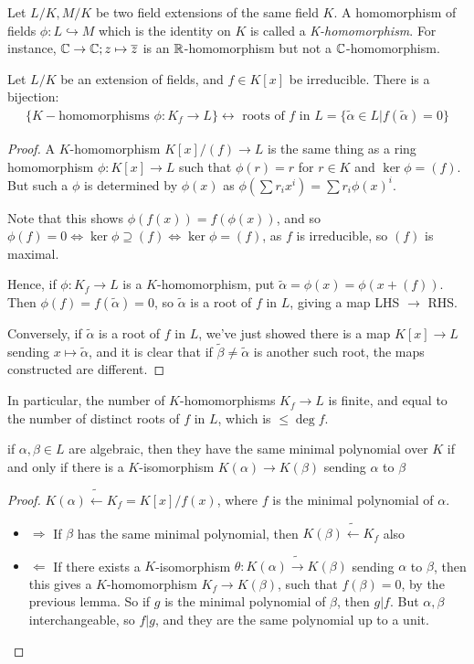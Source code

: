 \documentclass[10pt,a4paper]{article}
\begin{document}
Let $L/K, M/K$ be two field extensions of the same field $K$. A homomorphism of fields $\phi:L\hookrightarrow M$ which is the identity on $K$ is called a \emph{K-homomorphism}. For instance, $\mathbb{C}\rightarrow \mathbb{C}; z\mapsto \overline{z}$ is an $\mathbb{R}$-homomorphism but not a $\mathbb{C}$-homomorphism.
\begin{lemma}
Let $L/K$ be an extension of fields, and $f\in K[x]$ be irreducible. There is a bijection:
\begin{align*}
\{K-\text{homomorphisms } \phi:K_f \rightarrow L\} \longleftrightarrow\text{ roots of $f$ in }L = \{\tilde{\alpha}\in L|f(\tilde{\alpha}) = 0 \}
\end{align*}
\end{lemma}
\begin{proof}
A $K$-homomorphism $K[x]/(f) \rightarrow L$ is the same thing as a ring homomorphism $\phi:K[x]\rightarrow L$ such that $\phi(r) = r$ for $r\in K$ and $\ker\phi = (f)$. But such a $\phi$ is determined by $\phi(x)$ as $\phi(\sum r_ix^i) = \sum r_i \phi(x)^i$.

Note that this shows $\phi(f(x)) = f(\phi(x))$, and so $\phi(f) = 0 \iff \ker \phi \supseteq (f) \iff \ker \phi = (f)$, as $f$ is irreducible, so $(f)$ is maximal.

Hence, if $\phi: K_f \rightarrow L$ is a $K$-homomorphism, put $\tilde{\alpha} = \phi(x) = \phi(x+(f))$. Then $\phi(f) = f(\tilde{\alpha}) = 0$, so $\tilde{\alpha}$ is a root of $f$ in $L$, giving a map LHS $\rightarrow$ RHS.

Conversely, if $\tilde{\alpha}$ is a root of $f$ in $L$, we've just showed there is a map $K[x]\rightarrow L$ sending $x\mapsto \tilde{\alpha}$, and it is clear that if $\tilde{\beta} \neq \tilde{\alpha}$ is another such root, the maps constructed are different.
\end{proof}
In particular, the number of $K$-homomorphisms $K_f\rightarrow L$ is finite, and equal to the number of distinct roots of $f$ in $L$, which is $\leq \deg f$.

\begin{corollary}
if $\alpha, \beta \in L$ are algebraic, then they have the same minimal polynomial over $K$ if and only if there is a $K$-isomorphism $K(\alpha) \rightarrow K(\beta)$ sending $\alpha$ to $\beta$
\end{corollary}
\begin{proof}
$K(\alpha)\tilde{\longleftarrow} K_f = K[x]/f(x)$, where $f$ is the minimal polynomial of $\alpha$.
\begin{itemize}
\item{$\Longrightarrow$} If $\beta$ has the same minimal polynomial, then $K(\beta) \tilde{\longleftarrow} K_f$ also

\item{$\Longleftarrow$} If there exists a $K$-isomorphism $\theta:K(\alpha) \tilde{\longrightarrow} K(\beta)$ sending $\alpha$ to $\beta$, then this gives a $K$-homomorphism $K_f \rightarrow K(\beta)$, such that $f(\beta) = 0$, by the previous lemma. So if $g$ is the minimal polynomial of $\beta$, then $g|f$. But $\alpha, \beta$ interchangeable, so $f|g$, and they are the same polynomial up to a unit.
\end{itemize}
\end{proof}
\end{document}
